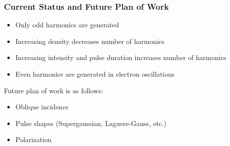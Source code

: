 \documentclass{beamer}
\begin{document}
\begin{frame}
    \frametitle{Current Status and Future Plan of Work}
    \begin{itemize}
        \item Only odd harmonics are generated
        \item Increasing density decreases number of harmonics
        \item Increasing intensity and pulse duration increases number of harmonics
        \item Even harmonics are generated in electron oscillations
    \end{itemize}
    Future plan of work is as follows:
    \begin{itemize}
        \item Oblique incidence
        \item Pulse shapes (Supergaussian, Laguere-Gauss, etc.)
        \item Polarization
    \end{itemize}
\end{frame}

\end{document}
